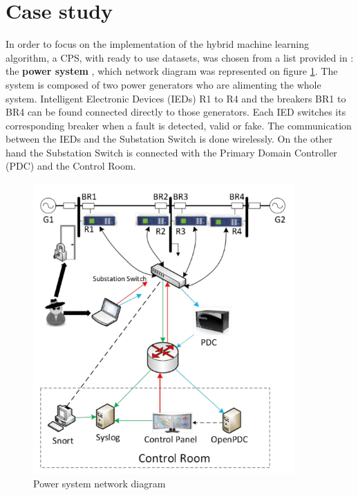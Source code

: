 \section{Case study}
In order to focus on the implementation of the hybrid machine learning algorithm, a CPS, with ready to use datasets, was chosen from a list provided in \cite{morris_industrial_nodate}: the \textbf{power system} \cite{adhikari_power_2014}, which network diagram was represented on figure \ref{fig:cps_rep}. The system is composed of two power generators who are alimenting the whole system. Intelligent Electronic Devices (IEDs) R1 to R4 and the breakers BR1 to BR4 can be found connected directly to those generators. Each IED switches its corresponding breaker when a fault is detected, valid or fake. The communication between the IEDs and the Substation Switch is done wirelessly. On the other hand the Substation Switch is connected with the Primary Domain Controller (PDC) and the Control Room.

\begin{figure}[H]
    \centering
    \includegraphics[width=100mm]{images/cps_rep.png}
    \caption[Power system network diagram]{Power system network diagram \cite{adhikari_power_2014}}
    \label{fig:cps_rep}
\end{figure}

